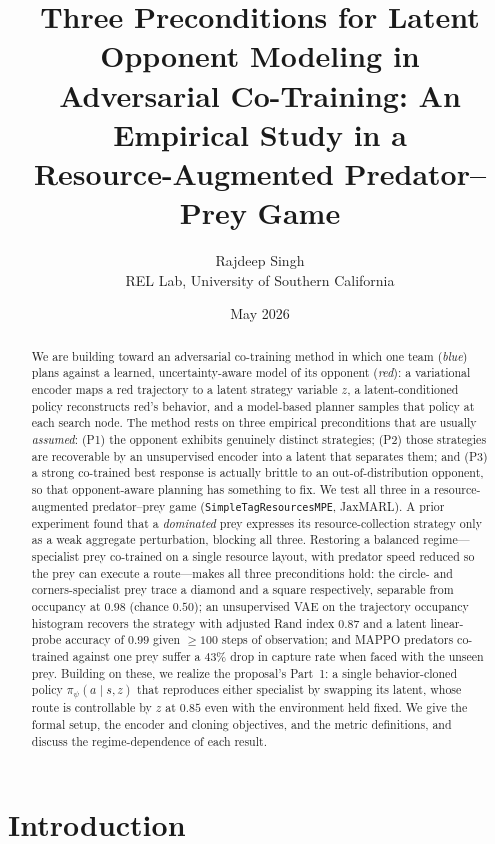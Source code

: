 \documentclass[11pt]{article}
\title{Three Preconditions for Latent Opponent Modeling in\\
Adversarial Co-Training: An Empirical Study in a\\
Resource-Augmented Predator--Prey Game}
\author{Rajdeep Singh \\ REL Lab, University of Southern California}
\date{May 2026}
\newcommand{\zlat}{z}
\begin{document}
\maketitle

\begin{abstract}
We are building toward an adversarial co-training method in which one team
(\emph{blue}) plans against a learned, uncertainty-aware model of its opponent
(\emph{red}): a variational encoder maps a red trajectory to a latent strategy
variable $\zlat$, a latent-conditioned policy reconstructs red's behavior, and a
model-based planner samples that policy at each search node. The method rests on
three empirical preconditions that are usually \emph{assumed}: (P1) the opponent
exhibits genuinely distinct strategies; (P2) those strategies are recoverable by
an unsupervised encoder into a latent that separates them; and (P3) a strong
co-trained best response is actually brittle to an out-of-distribution opponent,
so that opponent-aware planning has something to fix. We test all three in a
resource-augmented predator--prey game (\texttt{SimpleTagResourcesMPE}, JaxMARL).
A prior experiment found that a \emph{dominated} prey expresses its
resource-collection strategy only as a weak aggregate perturbation, blocking all
three. Restoring a balanced regime---specialist prey co-trained on a single
resource layout, with predator speed reduced so the prey can execute a
route---makes all three preconditions hold: the circle- and corners-specialist
prey trace a diamond and a square respectively, separable from occupancy at
$0.98$ (chance $0.50$); an unsupervised VAE on the trajectory occupancy
histogram recovers the strategy with adjusted Rand index $0.87$ and a latent
linear-probe accuracy of $0.99$ given $\geq 100$ steps of observation; and MAPPO
predators co-trained against one prey suffer a $43\%$ drop in capture rate when
faced with the unseen prey. Building on these, we realize the proposal's Part~1:
a single behavior-cloned policy $\pi_\psi(a \mid s, \zlat)$ that reproduces either
specialist by swapping its latent, whose route is controllable by $\zlat$ at
$0.85$ even with the environment held fixed. We give the formal setup, the
encoder and cloning objectives, and the metric definitions, and discuss the
regime-dependence of each result.
\end{abstract}


\section{Introduction}
\end{document}
